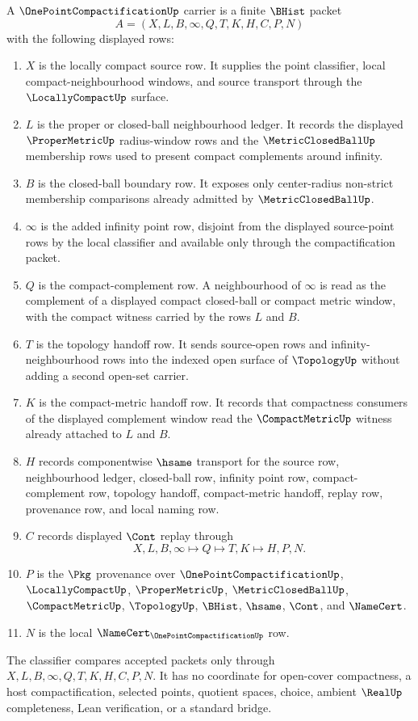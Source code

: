 \begin{definition}
\label{def:one-point-compactification-carrier}
A $\OnePointCompactificationUp$ carrier is a finite $\BHist$ packet
$$
A=(X,L,B,\infty,Q,T,K,H,C,P,N)
$$
with the following displayed rows:
\begin{enumerate}
\item $X$ is the locally compact source row. It supplies the point classifier, local compact-neighbourhood windows, and source transport through the $\LocallyCompactUp$ surface.
\item $L$ is the proper or closed-ball neighbourhood ledger. It records the displayed $\ProperMetricUp$ radius-window rows and the $\MetricClosedBallUp$ membership rows used to present compact complements around infinity.
\item $B$ is the closed-ball boundary row. It exposes only center-radius non-strict membership comparisons already admitted by $\MetricClosedBallUp$.
\item $\infty$ is the added infinity point row, disjoint from the displayed source-point rows by the local classifier and available only through the compactification packet.
\item $Q$ is the compact-complement row. A neighbourhood of $\infty$ is read as the complement of a displayed compact closed-ball or compact metric window, with the compact witness carried by the rows $L$ and $B$.
\item $T$ is the topology handoff row. It sends source-open rows and infinity-neighbourhood rows into the indexed open surface of $\TopologyUp$ without adding a second open-set carrier.
\item $K$ is the compact-metric handoff row. It records that compactness consumers of the displayed complement window read the $\CompactMetricUp$ witness already attached to $L$ and $B$.
\item $H$ records componentwise $\hsame$ transport for the source row, neighbourhood ledger, closed-ball row, infinity point row, compact-complement row, topology handoff, compact-metric handoff, replay row, provenance row, and local naming row.
\item $C$ records displayed $\Cont$ replay through
$$
X,L,B,\infty \longmapsto Q \longmapsto T,K \longmapsto H,P,N .
$$
\item $P$ is the $\Pkg$ provenance over $\OnePointCompactificationUp$, $\LocallyCompactUp$, $\ProperMetricUp$, $\MetricClosedBallUp$, $\CompactMetricUp$, $\TopologyUp$, $\BHist$, $\hsame$, $\Cont$, and $\NameCert$.
\item $N$ is the local $\NameCert_{\OnePointCompactificationUp}$ row.
\end{enumerate}
The classifier compares accepted packets only through $X,L,B,\infty,Q,T,K,H,C,P,N$. It has no coordinate for open-cover compactness, a host compactification, selected points, quotient spaces, choice, ambient $\RealUp$ completeness, Lean verification, or a standard bridge.
\end{definition}


